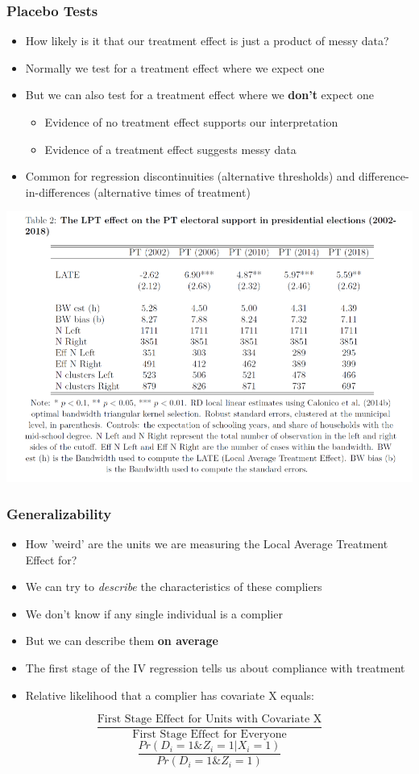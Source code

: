 \documentclass[xcolor=x11names,compress]{beamer}\usepackage[]{graphicx}\usepackage[]{color}
\renewcommand{\(}{\begin{columns}}
\renewcommand{\)}{\end{columns}}
\newcommand{\<}[1]{\begin{column}{#1}}
\renewcommand{\>}{\end{column}}
\begin{document}
\begin{frame}
\frametitle{Placebo Tests}
\begin{itemize}
\item How likely is it that our treatment effect is just a product of messy data?
\pause
\item Normally we test for a treatment effect where we expect one
\pause
\item But we can also test for a treatment effect where we \textbf{don't} expect one
\begin{itemize}
\item Evidence of no treatment effect supports our interpretation
\pause
\item Evidence of a treatment effect suggests messy data
\end{itemize}
\pause
\item Common for regression discontinuities (alternative thresholds) and difference-in-differences (alternative times of treatment)
\end{itemize}
\end{frame}

\begin{frame}
\includegraphics[width=\linewidth]{placebo.png}
\end{frame}


\begin{frame}
\frametitle{Generalizability}
\begin{itemize}
\item How 'weird' are the units we are measuring the Local Average Treatment Effect for?
\pause
\item We can try to \textit{describe} the characteristics of these compliers
\pause
\item We don't know if any single individual is a complier
\pause
\item But we can describe them \textbf{on average}
\pause
\item The first stage of the IV regression tells us about compliance with treatment
\pause
\item Relative likelihood that a complier has covariate X equals:
\end{itemize}
\pause
$$\frac{\text{First Stage Effect for Units with Covariate X}}{\text{First Stage Effect for Everyone}}$$
\pause
$$\frac{Pr(D_i=1 \& Z_i=1 | X_i=1)}{Pr(D_i=1 \& Z_i=1)}$$
\end{frame}
\end{document}
